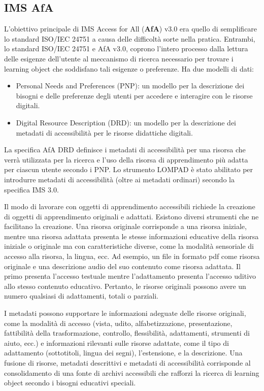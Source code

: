 \subsection{IMS AfA}
L'obiettivo principale di IMS Access for All (\textbf{AfA}) v3.0 era quello di semplificare lo standard ISO/IEC 24751 a causa delle difficoltà sorte nella pratica. Entrambi, lo standard ISO/IEC 24751 e AfA v3.0, coprono l'intero processo dalla lettura delle esigenze dell'utente al meccanismo di ricerca necessario per trovare i learning object che soddisfano tali esigenze o preferenze. Ha due modelli di dati:
\begin{itemize}
\item Personal Needs and Preferences (PNP): un modello per la descrizione dei bisogni e delle preferenze degli utenti per accedere e interagire con le risorse digitali.
\item Digital Resource Description (DRD): un modello per la descrizione dei metadati di accessibilità per le risorse didattiche digitali.
\end{itemize}

La specifica AfA DRD definisce i metadati di accessibilità per una risorsa che verrà utilizzata per la ricerca e l'uso della risorsa di apprendimento più adatta per ciascun utente secondo i PNP. Lo strumento LOMPAD è stato abilitato per introdurre metadati di accessibilità (oltre ai metadati ordinari) secondo la specifica IMS 3.0.

Il modo di lavorare con oggetti di apprendimento accessibili richiede la creazione di oggetti di apprendimento originali e adattati. Esistono diversi strumenti che ne facilitano la creazione. Una risorsa originale corrisponde a una risorsa iniziale, mentre una risorsa adattata presenta le stesse informazioni educative della risorsa iniziale o originale ma con caratteristiche diverse, come la modalità sensoriale di accesso alla risorsa, la lingua, ecc. Ad esempio, un file in formato pdf come risorsa originale e una descrizione audio del suo contenuto come risorsa adattata. Il primo presenta l'accesso testuale mentre l'adattamento presenta l'accesso uditivo allo stesso contenuto educativo. Pertanto, le risorse originali possono avere un numero qualsiasi di adattamenti, totali o parziali.

I metadati possono supportare le informazioni adeguate delle risorse originali, come la modalità di accesso (vista, udito, alfabetizzazione, presentazione, fattibilità della trasformazione, controllo, flessibilità, adattamenti, strumenti di aiuto, ecc.) e informazioni rilevanti sulle risorse adattate, come il tipo di adattamento (sottotitoli, lingua dei segni), l'estensione, e la descrizione. Una fusione di risorse, metadati descrittivi e metadati di accessibilità corrisponde al consolidamento di una fonte di archivi accessibili che rafforzi la ricerca di learning object secondo i bisogni educativi speciali.

